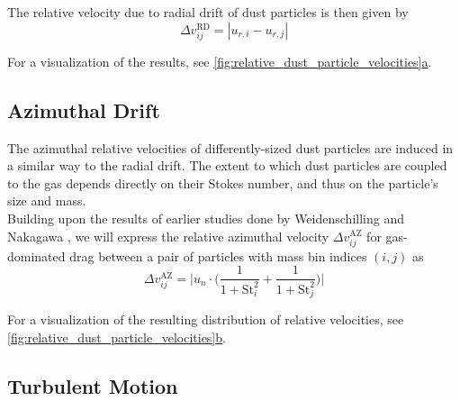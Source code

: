         The relative velocity due to radial drift of dust particles is then given by
        \begin{equation}
            \Delta v_{ij}^\text{RD}
            =|u_{r,i}-u_{r,j}|
        \end{equation}
    
        For a visualization of the results, see 
        \hyperref[fig:relative_dust_particle_velocities]
        {\cref*{fig:relative_dust_particle_velocities}a}.

    \subsection{Azimuthal Drift}

        The azimuthal relative velocities of differently-sized dust particles are induced in a 
        similar way to the radial drift. The extent to which dust particles are coupled to the gas 
        depends directly on their Stokes number, and thus on the particle's size and mass. \\

        Building upon the results of earlier studies done by 
        Weidenschilling \cite{weidenschilling_1977} and Nakagawa \cite{nakagawa_1986}, 
        we will express the relative azimuthal velocity $\Delta v^\text{AZ}_{ij}$ for 
        gas-dominated drag between a pair of particles with mass bin indices $(i, j)$ as
        \begin{equation}
            \Delta v^\text{AZ}_{ij}=\bigg|
                u_n\cdot\bigg(
                    \frac{1}{1+\text{St}_i^2}+
                    \frac{1}{1+\text{St}_j^2}
                \bigg)
            \bigg|
        \end{equation}

        For a visualization of the resulting distribution of relative velocities, see 
        \hyperref[fig:relative_dust_particle_velocities]
        {\cref*{fig:relative_dust_particle_velocities}b}.

    \subsection{Turbulent Motion}

